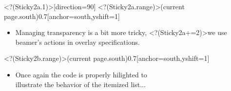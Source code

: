 \transpush<?(Sticky2a.1)>[direction=90]
\BealoverSticky<?(Sticky2a.range)>(current page.south){0.7\textwidth}[anchor=south,yshift=1\baselineskip]{\bfseries%
\vspace{-0.5\baselineskip}%
\begin{itemize}
\item[\myBulb]Managing transparency is a bit more tricky,
\visible<?(Sticky2a+=2)>{we%
use beamer's actions in overlay specifications.%
}%
\end{itemize}
}%
\BealoverSticky<?(Sticky2b.range)>(current page.south){0.7\textwidth}[anchor=south,yshift=1\baselineskip]{\bfseries%
\vspace{-0.5\baselineskip}%
\begin{itemize}
\item[\myBulb]Once again the code is properly hilighted to\\illustrate the behavior of the itemized list...
\end{itemize}
}%
%
